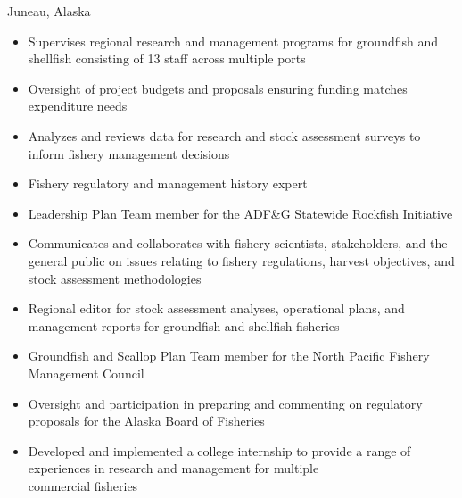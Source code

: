 \documentclass[10pt,a4paper,ragged2e]{altacv}
\begin{document}
\begin{fullwidth}


 {Juneau, Alaska}
\begin{itemize}
    \item  Supervises regional research and management programs for groundfish and shellfish consisting of 13 staff across multiple ports
    \item Oversight of project budgets and proposals ensuring funding matches expenditure needs
    \item Analyzes and reviews data for research and stock assessment surveys to inform fishery management decisions
    \item Fishery regulatory and management history expert
    \item Leadership Plan Team member for the ADF\&G Statewide Rockfish Initiative
    \item Communicates and collaborates with fishery scientists, stakeholders, and the general public on issues relating to fishery regulations, harvest objectives, and stock assessment methodologies
    \item Regional editor for stock assessment analyses, operational plans, and management reports for groundfish and shellfish fisheries
    \item Groundfish and Scallop Plan Team member for the North Pacific Fishery Management Council 
    \item Oversight and participation in preparing and commenting on regulatory proposals for the Alaska Board of Fisheries
    \item Developed and implemented a college internship to provide a range of experiences in research and management for multiple
    \\commercial fisheries


\end{itemize}
\vspace{0.15cm}


\end{fullwidth}
\end{document}
